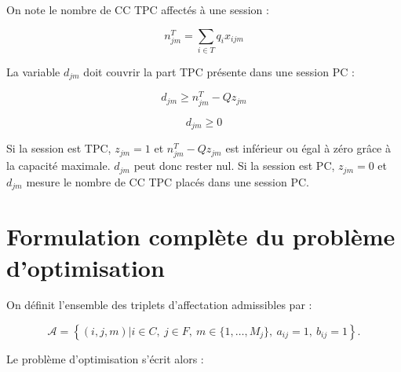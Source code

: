 \documentclass[11pt,a4paper]{article}
\begin{document}
On note le nombre de CC TPC affectés à une session :

\[
n_{jm}^{T}
=
\sum_{i\in T} q_i x_{ijm}
\]

La variable $d_{jm}$ doit couvrir la part TPC présente dans une session PC :

\[
d_{jm} \geq n_{jm}^{T} - Qz_{jm}
\]

\[
d_{jm} \geq 0
\]

Si la session est TPC, $z_{jm} = 1$ et $n_{jm}^{T} - Qz_{jm}$ est inférieur ou égal à zéro grâce à la capacité maximale. $d_{jm}$ peut donc rester nul. Si la session est PC, $z_{jm} = 0$ et $d_{jm}$ mesure le nombre de CC TPC placés dans une session PC.

\newpage
\section{Formulation complète du problème d'optimisation}

On définit l'ensemble des triplets d'affectation admissibles par :

\[
\mathcal{A}
=
\left\{
(i,j,m)
|
i \in C,\ j \in F,\ m \in \{1,\dots,M_j\},\ a_{ij}=1,\ b_{ij}=1
\right\}.
\]

Le problème d'optimisation s'écrit alors :
\end{document}
